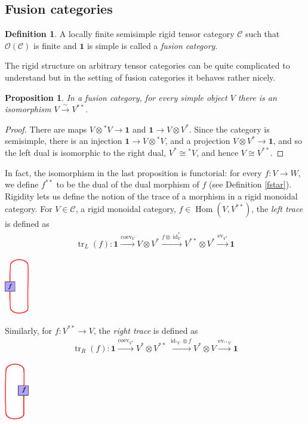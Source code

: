 \documentclass[a4paper, 10pt]{book}
\newtheorem{Prop}[theorem]{Proposition}
\theoremstyle{definition}
\newtheorem{Def}[theorem]{Definition}
\numberwithin{equation}{chapter}
\newcommand\tr{\operatorname{tr}}
\newcommand\id{\operatorname{id}}
\newcommand\Hom{\operatorname{Hom}}
\newcommand\C{\mathcal C}
\newcommand\OO{\mathcal O}
\newcommand{\ra}\rightarrow
\newcommand{\xra}\xrightarrow
\newcommand\one{\mathbf{1}}
\newcommand\ev{\operatorname{ev}}
\newcommand\coev{\operatorname{coev}}
\begin{document}
\subsection{Fusion categories}
\begin{Def}
A locally finite semisimple rigid tensor category  $\C$ such that $\OO(\C)$ is finite and $\one$ is simple is called a \textit{fusion category}.
\end{Def}
The rigid structure on arbitrary tensor categories can be quite complicated to understand but in the setting of fusion categories it behaves rather nicely.
\begin{Prop}\label{doublestar}
In a fusion category, for every simple object $V$ there is an isomorphism $V\xra{\sim} V^{**}$.
\end{Prop}
\begin{proof}
There are maps $V\otimes {}^*V\rightarrow \one$ and $\one \rightarrow V\otimes V^* $. Since the category is semisimple, there is an injection  $ \one \rightarrow V\otimes {}^*V$, and a projection $V\otimes V^*\rightarrow \one$, and so the left dual is isomorphic to the right dual, $V^*\cong {}^*V$, and hence $V\cong V^{**}$.
\end{proof}
In fact, the isomorphism in the last proposition is functorial: for every $f:V\ra W$, we define $f^{**}$ to be the dual of the dual morphism of $f$ (see Definition \ref{fstar}).\\
Rigidity lets us define the notion of the trace of a morphism in a rigid monoidal category. For $V\in \C$, a rigid monoidal category,  $f\in \Hom(V, V^{**})$, the \textit{left trace}  is defined as \begin{align}
\tr_L(f): \one \overset{\coev_V}\longrightarrow V\otimes V^{*} \overset{f\otimes \id_V^*}\longrightarrow V^{**} \otimes V^* \overset{\ev_{V^*}}\longrightarrow \one \end{align} 
\begin{center}
\includegraphics[width=0.08\textwidth]{lefttrace.eps}
\end{center}

Similarly, for $f: V^{**} \rightarrow V$, the \textit{right trace} is defined as
\begin{align}
\tr_R(f): \one \overset{\coev_{V^*}}\longrightarrow V^*\otimes V^{**} \overset{\id_{{}^*V}\otimes f}\longrightarrow V^* \otimes V \overset{\ev_{{}^{**}V}}\longrightarrow \one  
\end{align}
\begin{center}
\includegraphics[width=0.08\textwidth]{righttrace.eps}
\end{center}
\end{document}
